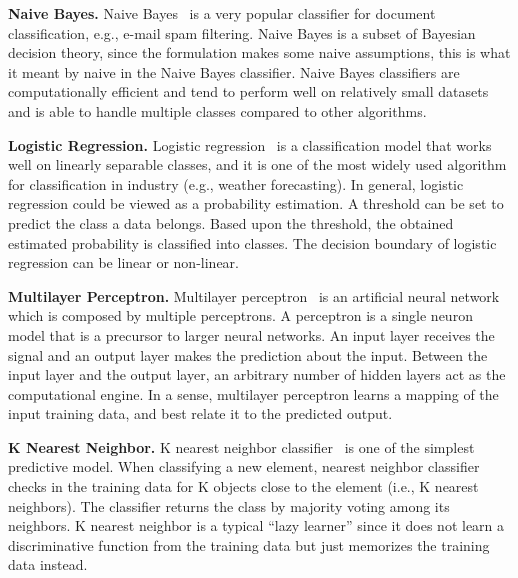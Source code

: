 \textbf{Naive Bayes.} Naive Bayes~\cite{rish2001empirical} is a very popular classifier for document classification, e.g., e-mail spam filtering. Naive Bayes is a subset of Bayesian decision theory, since the formulation makes some naive assumptions, this is what it meant by naive in the Naive Bayes classifier. Naive Bayes classifiers are computationally efficient and tend to perform well on relatively small datasets and is able to handle multiple classes compared to other algorithms.

\textbf{Logistic Regression.} Logistic regression~\cite{hosmer2013applied} is a classification model that works well on linearly separable classes, and it is one of the most widely used algorithm for classification in industry (e.g., weather forecasting). In general, logistic regression could be viewed as a probability estimation. A threshold can be set to predict the class a data belongs. Based upon the threshold, the obtained estimated probability is classified into classes. The decision boundary of logistic regression can be linear or non-linear. 

\textbf{Multilayer Perceptron.} Multilayer perceptron~\cite{gardner1998artificial} is an artificial neural network which is composed by multiple perceptrons. A perceptron is a single neuron model that is a precursor to larger neural networks. An input layer receives the signal and an output layer makes the prediction about the input. Between the input layer and the output layer, an arbitrary number of hidden layers act as the computational engine. In a sense, multilayer perceptron learns a mapping of the input training data, and best relate it to the predicted output. 

\textbf{K Nearest Neighbor.} K nearest neighbor classifier~\cite{keller1985fuzzy} is one of the simplest predictive model. When classifying a new element, nearest neighbor classifier checks in the training data for K objects close to the element (i.e., K nearest neighbors). The classifier returns the class by majority voting among its neighbors. K nearest neighbor is a typical ``lazy learner'' since it does not learn a discriminative function from the training data but just memorizes the training data instead. 


